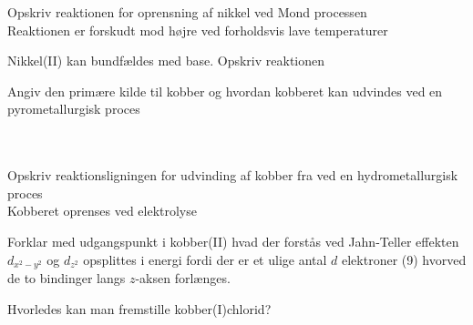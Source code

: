 \begin{flashcard}[Fremstilling]{Opskriv reaktionen for oprensning af nikkel ved Mond processen}
\\\vspace*{0.5cm}
Reaktionen er forskudt mod højre ved forholdsvis lave temperaturer
\end{flashcard}

\begin{flashcard}[Egenskab]{Nikkel(II) kan bundfældes med base. Opskriv reaktionen}
\end{flashcard}

\begin{flashcard}[Fremstilling]{Angiv den primære kilde til kobber og hvordan kobberet kan udvindes ved en pyrometallurgisk proces}
\\
\\
\\
\end{flashcard}

\begin{flashcard}[Fremstilling]{Opskriv reaktionsligningen for udvinding af kobber fra  ved en hydrometallurgisk proces}
\\
Kobberet oprenses ved elektrolyse
\end{flashcard}

\begin{flashcard}[Egenskab]{Forklar med udgangspunkt i kobber(II) hvad der forstås ved Jahn-Teller effekten}
$d_{x^2-y^2}$ og $d_{z^2}$ opsplittes i energi fordi der er et ulige antal $d$ elektroner (9) hvorved de to bindinger langs $z$-aksen forlænges.
\end{flashcard}

\begin{flashcard}[Fremstilling]{Hvorledes kan man fremstille kobber(I)chlorid?}
\\
\\
\end{flashcard}